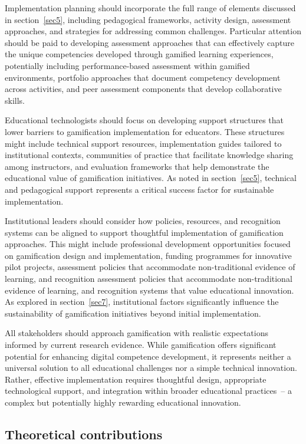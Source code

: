 \documentclass[cte]{acnsart}
\begin{document}
Implementation planning should incorporate the full range of elements discussed in section~\ref{sec5}, including pedagogical frameworks, activity design, assessment approaches, and strategies for addressing common challenges. Particular attention should be paid to developing assessment approaches that can effectively capture the unique competencies developed through gamified learning experiences, potentially including performance-based assessment within gamified environments, portfolio approaches that document competency development across activities, and peer assessment components that develop collaborative skills.

Educational technologists should focus on developing support structures that lower barriers to gamification implementation for educators. These structures might include technical support resources, implementation guides tailored to institutional contexts, communities of practice that facilitate knowledge sharing among instructors, and evaluation frameworks that help demonstrate the educational value of gamification initiatives. As noted in section~\ref{sec5}, technical and pedagogical support represents a critical success factor for sustainable implementation.

Institutional leaders should consider how policies, resources, and recognition systems can be aligned to support thoughtful implementation of gamification approaches. This might include professional development opportunities focused on gamification design and implementation, funding programmes for innovative pilot projects, assessment policies that accommodate non-traditional evidence of learning, and recognition assessment policies that accommodate non-traditional evidence of learning, and recognition systems that value educational innovation. As explored in section~\ref{sec7}, institutional factors significantly influence the sustainability of gamification initiatives beyond initial implementation.

All stakeholders should approach gamification with realistic expectations informed by current research evidence. While gamification offers significant potential for enhancing digital competence development, it represents neither a universal solution to all educational challenges nor a simple technical innovation. Rather, effective implementation requires thoughtful design, appropriate technological support, and integration within broader educational practices~-- a complex but potentially highly rewarding educational innovation.

\subsection{Theoretical contributions}
\end{document}

